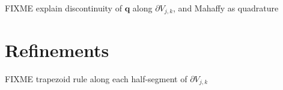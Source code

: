 \documentclass[11pt]{amsart}
\newcommand\bq{\mathbf{q}}
\begin{document}
FIXME explain discontinuity of $\bq$ along $\partial V_{j,k}$, and Mahaffy as quadrature

\section{Refinements}

FIXME trapezoid rule along each half-segment of  $\partial V_{j,k}$






\begin{comment}
Here is what the MPAS Land-Ice User's Manual version 3.0 says:

\begin{quote}
\small
Velocities and fluxes are calculated on the midpoint of Voronoi cell edges.  The normal component of surface slope is calculated on cell edges using surface elevation at adjacent cell centers.  The tangential component of surface slope is calculated on cell edges using surface elevation at adjacent vertices. The surface elevation at vertices is calculated from the values at adjacent cell centers using barycentric interpolation. Ice thickness on edges is calculated as the average of the adjacent cell center values (2nd-order approximation).
\end{quote}

Looking at this, and the code, I don't think they think of it as Petrov-Galerkin
\end{comment}
\end{document}
